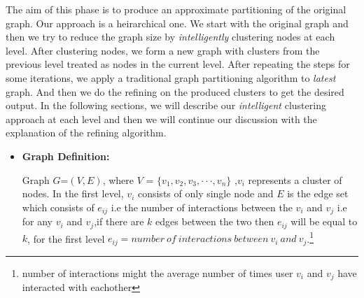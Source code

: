 \documentclass[letterpaper]{article}
\begin{document}
The aim of this phase is to produce an approximate partitioning of the original
graph. Our approach is a heirarchical one.  We start with the original graph
and then we try to reduce the graph size by \emph{intelligently} clustering
nodes at each level. After clustering nodes, we form a new graph with clusters
from the previous level treated as nodes in the current level. After repeating
the steps for some iterations, we apply a traditional graph partitioning
algorithm to \emph{latest} graph. And then we do the refining on the produced
clusters to get the desired output. In the following sections, we will describe
our \emph{intelligent} clustering approach at each level and then we will
continue our discussion with the explanation of the refining algorithm.
\begin{itemize} %

\item \textbf{Graph Definition:}

Graph  $G$=$(V,E)$, where $V$ = $\{v_1,v_2,v_3,\cdot\cdot\cdot,v_n\}$ ,$v_i$ represents a cluster of nodes. 
In the first level, $v_i$ consists of only single node and $E$ is the edge set which consists of $e_{ij}$ i.e the number of interactions between the $v_i$ and $v_j$ i.e for any $v_i$ and $v_j$,if there are $k$ edges between 
the two then $e_{ij}$ will be equal to $k$, for the first level $e_{ij}=number\ of\ interactions\ between\ v_i\ and\ v_j$.\footnote{number of interactions might the average number of times user $v_i$ and $v_j$ have interacted
with eachother} 

\end{itemize} %
\end{document}
